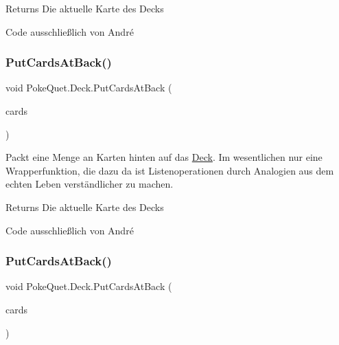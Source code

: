 \begin{DoxyReturn}{Returns}
Die aktuelle Karte des Decks
\end{DoxyReturn}


Code ausschließlich von André\mbox{\label{class_poke_quet_1_1_deck_a48673ad29ddff99adc0d494192d5f47c}} 
\subsubsection{\texorpdfstring{Put\+Cards\+At\+Back()}{PutCardsAtBack()}\hspace{0.1cm}{\footnotesize\ttfamily [1/2]}}
{\footnotesize\ttfamily void Poke\+Quet.\+Deck.\+Put\+Cards\+At\+Back (\begin{DoxyParamCaption}\item[{I\+Enumerable$<$ \mbox{\hyperlink{class_poke_quet_1_1_card}{Card}} $>$}]{cards }\end{DoxyParamCaption})\hspace{0.3cm}{\ttfamily [inline]}}



Packt eine Menge an Karten hinten auf das \mbox{\hyperlink{class_poke_quet_1_1_deck}{Deck}}. Im wesentlichen nur eine Wrapperfunktion, die dazu da ist Listenoperationen durch Analogien aus dem echten Leben verständlicher zu machen. 

\begin{DoxyReturn}{Returns}
Die aktuelle Karte des Decks
\end{DoxyReturn}


Code ausschließlich von André\mbox{\label{class_poke_quet_1_1_deck_ae72396d102166a59850288ccb5be7fd1}} 
\subsubsection{\texorpdfstring{Put\+Cards\+At\+Back()}{PutCardsAtBack()}\hspace{0.1cm}{\footnotesize\ttfamily [2/2]}}
{\footnotesize\ttfamily void Poke\+Quet.\+Deck.\+Put\+Cards\+At\+Back (\begin{DoxyParamCaption}\item[{params \mbox{\hyperlink{class_poke_quet_1_1_card}{Card}} \mbox{[}$\,$\mbox{]}}]{cards }\end{DoxyParamCaption})\hspace{0.3cm}{\ttfamily [inline]}}



